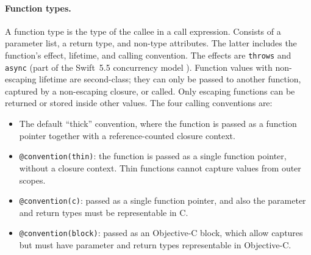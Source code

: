 \documentclass[../generics]{subfiles}
\begin{document}
\paragraph{Function types.} A function type is the type of the callee in a call expression. Consists of a parameter list, a return type, and non-type attributes. The latter includes the function's effect, lifetime, and calling convention. The effects are \texttt{throws} and \texttt{async} (part of the Swift~5.5 concurrency model \cite{se0296}). Function values with non-escaping lifetime are second-class; they can only be passed to another function, captured by a non-escaping closure, or called. Only escaping functions can be returned or stored inside other values. The four calling conventions are:
\begin{itemize}
\item The default ``thick'' convention, where the function is passed as a function pointer together with a reference-counted closure context.
\item \texttt{@convention(thin)}: the function is passed as a single function pointer, without a closure context. Thin functions cannot capture values from outer scopes.
\item \texttt{@convention(c)}: passed as a single function pointer, and also the parameter and return types must be representable in C.
\item \texttt{@convention(block)}: passed as an Objective-C block, which allow captures but must have parameter and return types representable in Objective-C.
\end{itemize}
\end{document}

